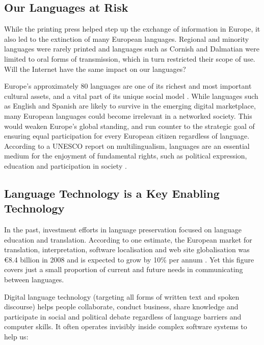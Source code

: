 \begin{multicols}{2}
\subsection{Our Languages at Risk}

    While the printing press helped step up the exchange of information in Europe, it also led to the extinction of many European languages. Regional and minority languages were rarely printed and languages such as Cornish and Dalmatian were limited to oral forms of transmission, which in turn restricted their scope of use. Will the Internet have the same impact on our languages?


    Europe’s approximately 80 languages are one of its richest and most important cultural assets, and a vital part of its unique social model \cite{GAL-Nota2}. While languages such as English and Spanish are likely to survive in the emerging digital marketplace, many European languages could become irrelevant in a networked society. This would weaken Europe’s global standing, and run counter to the strategic goal of ensuring equal participation for every European citizen regardless of language. According to a UNESCO report on multilingualism, languages are an essential medium for the enjoyment of fundamental rights, such as political expression, education and participation in society \cite{GAL-Nota3}.

\subsection{Language Technology is a Key Enabling Technology}

    In the past, investment efforts in language preservation focused on language education and translation. According to one estimate, the European market for translation, interpretation, software localisation and web site globalisation was €8.4 billion in 2008 and is expected to grow by 10\% per annum \cite{GAL-Nota3}. Yet this figure covers just a small proportion of current and future needs in communicating between languages. 

    Digital language technology (targeting all forms of written text and spoken discourse) helps people collaborate, conduct business, share knowledge and participate in social and political debate regardless of language barriers and computer skills. It often operates invisibly inside complex software systems to help us:


\end{multicols}
